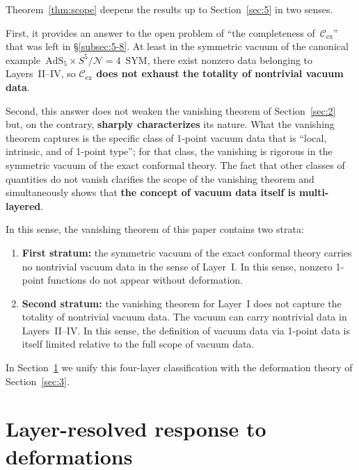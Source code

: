 \documentclass[
  aps,
  prd,
  preprint,
  groupedaddress,
  nofootinbib,
  longbibliography
]{revtex4-2}
\theoremstyle{remark}
\newcommand{\Cex}{\mathcal{C}_{\mathrm{ex}}}
\newcommand{\N}{\mathcal{N}}
\newcommand{\AdS}{\mathrm{AdS}}
\begin{document}
Theorem~\ref{thm:scope} deepens the results up to
Section~\ref{sec:5} in two senses.

First, it provides an answer to the open problem of
``the completeness of~$\Cex$'' that was left in
\S\ref{subsec:5-8}.
At least in the symmetric vacuum of the canonical
example~$\AdS_5\times S^5/\N=4$~SYM, there exist nonzero data
belonging to Layers~II--IV, so \textbf{$\Cex$ does not exhaust
the totality of nontrivial vacuum data}.

Second, this answer does not weaken the vanishing theorem of
Section~\ref{sec:2} but, on the contrary,
\textbf{sharply characterizes} its nature.
What the vanishing theorem captures is the specific class of
1-point vacuum data that is ``local, intrinsic, and of 1-point
type''; for that class, the vanishing is rigorous in the
symmetric vacuum of the exact conformal theory.
The fact that other classes of quantities do not vanish
clarifies the scope of the vanishing theorem and simultaneously
shows that \textbf{the concept of vacuum data itself is
multi-layered}.

In this sense, the vanishing theorem of this paper contains two
strata:
\begin{enumerate}
\item \textbf{First stratum:} the symmetric vacuum of the exact
  conformal theory carries no nontrivial vacuum data in the sense
  of Layer~I\@.
  In this sense, nonzero 1-point functions do not appear without
  deformation.
\item \textbf{Second stratum:} the vanishing theorem for
  Layer~I does not capture the totality of nontrivial vacuum data.
  The vacuum can carry nontrivial data in Layers~II--IV\@.
  In this sense, the definition of vacuum data via 1-point data
  is itself limited relative to the full scope of vacuum data.
\end{enumerate}

In Section~\ref{sec:7} we unify this four-layer classification
with the deformation theory of Section~\ref{sec:3}.

\section{Layer-resolved response to deformations}\label{sec:7}
\end{document}
